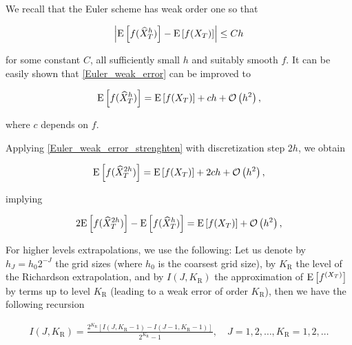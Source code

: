 We  recall that the Euler scheme has weak order one so that

\begin{align}\label{Euler_weak_error}
	\left\lvert\mathrm{E}\left[f(\widehat{X}_T^h)\right]-\mathrm{E}\left[f(X_T)\right] \right\rvert  \leq C h
\end{align}

for some constant $C$, all sufficiently small $h$ and suitably smooth $f$. It can be easily  shown that  \eqref{Euler_weak_error} can be improved to


\begin{align}\label{Euler_weak_error_strenghten}
	\mathrm{E}\left[f(\widehat{X}_T^h)\right]= \mathrm{E}\left[f(X_T)\right] + c h +{\mathcal{O}}\left(h^2\right) ,
\end{align}


where $c$ depends on $f$. 

Applying \eqref{Euler_weak_error_strenghten} with discretization step $2h$, we  obtain

\begin{align}\label{Euler_weak_error_strenghten_2h}
	\mathrm{E}\left[f(\widehat{X}_T^{2h})\right]= \mathrm{E}\left[f(X_T)\right] + 2 c h +{\mathcal{O}}\left(h^2\right) ,
\end{align}

implying

\begin{align}\label{Richardson_extrapol}
	2 \mathrm{E}\left[f(\widehat{X}_T^{2h})\right]- \mathrm{E}\left[f(\widehat{X}_T^{h})\right] =\mathrm{E}\left[f(X_T)\right] + {\mathcal{O}}\left(h^2\right) ,
\end{align}

For higher levels extrapolations, we use the following: Let us denote by $h_J=h_0 2^{-J}$ the grid sizes (where $h_0$ is the coarsest grid size), by $K_\text{R}$ the level of the Richardson extrapolation, and by $I(J,K_\text{R})$ the approximation of $\mathrm{E}\left[f^{(X_T)}\right]$ by terms up to level $K_\text{R}$ (leading to a weak error of order $K_\text{R}$), then we have the following recursion 

\begin{align}
I(J,K_\text{R})=\frac{2^{K_\text{R}}\left[I(J,K_\text{R}-1)-I(J-1,K_\text{R}-1)\right]}{2^{K_\text{R}}-1},\quad J=1,2,\dots, K_\text{R}=1,2,\dots
\end{align}


